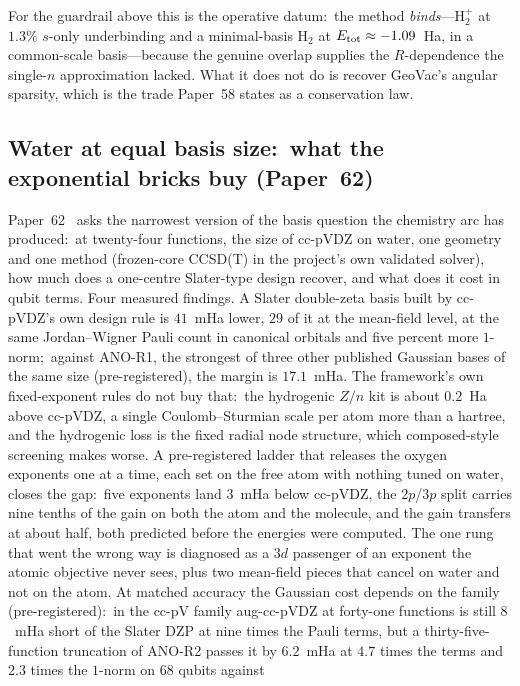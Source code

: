 \documentclass[aps,pra,twocolumn,superscriptaddress,longbibliography]{revtex4-2}
\begin{document}
For the guardrail above this is the operative datum:\ the method
\emph{binds}---$\mathrm{H}_2^+$ at $1.3\%$ $s$-only underbinding and a
minimal-basis $\mathrm{H}_2$ at $E_{\rm tot}\approx-1.09$~Ha, in a
common-scale basis---because the genuine overlap supplies the
$R$-dependence the single-$n$ approximation lacked.  What it does not do
is recover GeoVac's angular sparsity, which is the trade Paper~58 states
as a conservation law.

\subsection{Water at equal basis size:\ what the exponential bricks buy (Paper~62)}

Paper~62~\cite{loutey_paper62} asks the narrowest version of the
basis question the chemistry arc has produced:\ at twenty-four
functions, the size of cc-pVDZ on water, one geometry and one method
(frozen-core CCSD(T) in the project's own validated solver), how much
does a one-centre Slater-type design recover, and what does it cost in
qubit terms.  Four measured findings.  A Slater double-zeta basis built
by cc-pVDZ's own design rule is $41$~mHa lower, $29$ of it at the
mean-field level, at the same Jordan--Wigner Pauli count in canonical
orbitals and five percent more $1$-norm;\ against ANO-R1, the strongest of
three other published Gaussian bases of the same size (pre-registered),
the margin is $17.1$~mHa.  The framework's own fixed-exponent rules do not
buy that:\ the hydrogenic $Z/n$ kit is about $0.2$~Ha above cc-pVDZ, a
single Coulomb--Sturmian scale per atom more than a hartree, and the
hydrogenic loss is the fixed radial node structure, which composed-style
screening makes worse.  A pre-registered ladder that releases the oxygen
exponents one at a time, each set on the free atom with nothing tuned on
water, closes the gap:\ five exponents land $3$~mHa below cc-pVDZ, the
$2p$/$3p$ split carries nine tenths of the gain on both the atom and
the molecule, and the gain transfers at about half, both predicted before
the energies were computed.  The one rung that went the wrong way is
diagnosed as a $3d$ passenger of an exponent the atomic objective never
sees, plus two mean-field pieces that cancel on water and not on the
atom.  At matched accuracy the Gaussian cost depends on the family
(pre-registered):\ in the cc-pV family aug-cc-pVDZ at forty-one functions
is still $8$~mHa short of the Slater DZP at nine times the Pauli terms,
but a thirty-five-function truncation of ANO-R2 passes it by $6.2$~mHa at
$4.7$ times the terms and $2.3$ times the $1$-norm on $68$ qubits against
\end{document}
